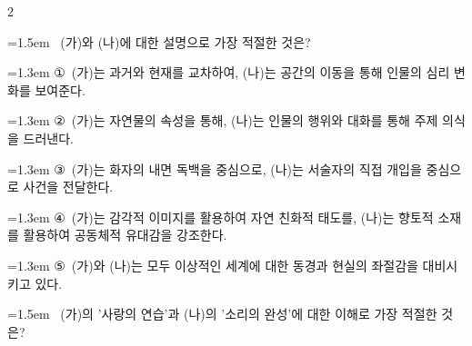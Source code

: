\documentclass[10pt, a4paper]{article}
\begin{document}
\begin{multicols}{2}
\noindent\begin{minipage}{\columnwidth}
\vspace{2mm}
{\hangindent=1.5em  ~(가)와 (나)에 대한 설명으로 가장 적절한 것은?\par}

\vspace{0.5mm}
{\hangindent=1.3em  \noindent\hspace{0.3em}①~(가)는 과거와 현재를 교차하여, (나)는 공간의 이동을 통해 인물의 심리 변화를 보여준다.\par}
{\hangindent=1.3em  \noindent\hspace{0.3em}②~(가)는 자연물의 속성을 통해, (나)는 인물의 행위와 대화를 통해 주제 의식을 드러낸다.\par}
{\hangindent=1.3em  \noindent\hspace{0.3em}③~(가)는 화자의 내면 독백을 중심으로, (나)는 서술자의 직접 개입을 중심으로 사건을 전달한다.\par}
{\hangindent=1.3em  \noindent\hspace{0.3em}④~(가)는 감각적 이미지를 활용하여 자연 친화적 태도를, (나)는 향토적 소재를 활용하여 공동체적 유대감을 강조한다.\par}
{\hangindent=1.3em  \noindent\hspace{0.3em}⑤~(가)와 (나)는 모두 이상적인 세계에 대한 동경과 현실의 좌절감을 대비시키고 있다.\par}
\vspace{4mm}
\end{minipage}
\par

\noindent\begin{minipage}{\columnwidth}
\vspace{2mm}
{\hangindent=1.5em  ~(가)의 '사랑의 연습'과 (나)의 '소리의 완성'에 대한 이해로 가장 적절한 것은?\par}


\end{minipage}
\end{multicols}
\end{document}
